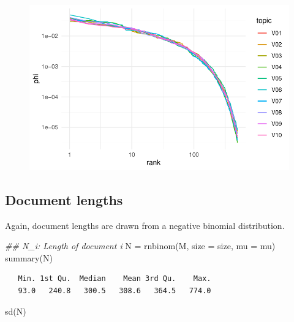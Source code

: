 \documentclass[
]{article}
\newenvironment{Shaded}{\begin{snugshade}}{\end{snugshade}}
\newcommand{\AttributeTok}[1]{\textcolor[rgb]{0.40,0.45,0.13}{#1}}
\newcommand{\DocumentationTok}[1]{\textcolor[rgb]{0.37,0.37,0.37}{\textit{#1}}}
\newcommand{\FunctionTok}[1]{\textcolor[rgb]{0.28,0.35,0.67}{#1}}
\newcommand{\NormalTok}[1]{\textcolor[rgb]{0.00,0.23,0.31}{#1}}
\newcommand{\OtherTok}[1]{\textcolor[rgb]{0.00,0.23,0.31}{#1}}
\begin{document}
\begin{figure}[H]

{\centering \includegraphics{paper_files/figure-pdf/unnamed-chunk-6-2.pdf}

}

\end{figure}

\hypertarget{document-lengths}{%
\subsection{Document lengths}\label{document-lengths}}

Again, document lengths are drawn from a negative binomial distribution.

\begin{Shaded}
\begin{Highlighting}[]
\DocumentationTok{\#\# N\_i:  Length of document i}
\NormalTok{N }\OtherTok{=} \FunctionTok{rnbinom}\NormalTok{(M, }\AttributeTok{size =}\NormalTok{ size, }\AttributeTok{mu =}\NormalTok{ mu)}
\FunctionTok{summary}\NormalTok{(N)}
\end{Highlighting}
\end{Shaded}

\begin{verbatim}
   Min. 1st Qu.  Median    Mean 3rd Qu.    Max. 
   93.0   240.8   300.5   308.6   364.5   774.0 
\end{verbatim}

\begin{Shaded}
\begin{Highlighting}[]
\FunctionTok{sd}\NormalTok{(N)}
\end{Highlighting}
\end{Shaded}
\end{document}
